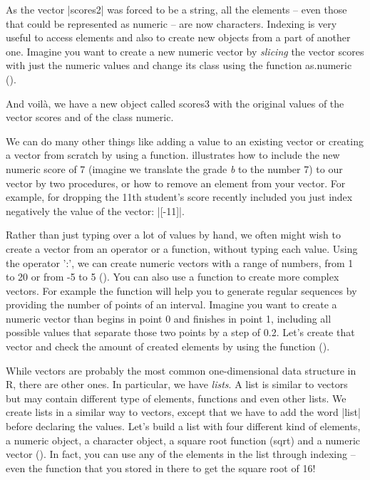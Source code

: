 As the vector |scores2| was forced to be a string, all the elements --
even those that could be represented as numeric -- are now
characters. Indexing is very useful to access elements and also to
create new objects from a part of another one. Imagine you want to
create a new numeric vector by \emph{slicing} the vector scores with
just the numeric values and change its class using the function
as.numeric ().

And voilà, we have a new object called scores3 with the original
values of the vector scores and of the class numeric.


We can do many other things like adding a value to an existing vector
or creating a vector from scratch by using a
function.  illustrates how to include the new numeric
score of 7 (imagine we translate the grade \emph{b} to the number 7)
to our vector by two procedures, or how to remove an element from your
vector. For example, for dropping the 11th student's score recently included you
just index negatively the value of the vector: |[-11]|.

Rather than just typing over a lot of values by hand, we often might
wish to create a vector from an operator or a function, without typing
each value. Using the operator ':', we can create numeric vectors with
a range of numbers, from 1 to 20 or from -5 to 5 ().
You can also use a function to create more complex vectors. For
example the function  will help you to generate regular sequences
by providing the number of points of an interval.  Imagine you want to
create a numeric vector than begins in point 0 and finishes in point
1, including all possible values that separate those two points by a
step of 0.2. Let's create that vector and check the amount of created
elements by using the function  ().

While vectors are probably the most common one-dimensional data
structure in R, there are other ones. In particular, we have
\emph{lists}. A list is similar to vectors but may contain different
type of elements, functions and even other lists. We create lists in a
similar way to vectors, except that we have to add the word |list|
before declaring the values. Let's build a list with four different
kind of elements, a numeric object, a character object, a square root
function (sqrt) and a numeric vector (). In fact, you
can use any of the elements in the list through indexing -- even the
function  that you stored in there to get the square root of
16!

